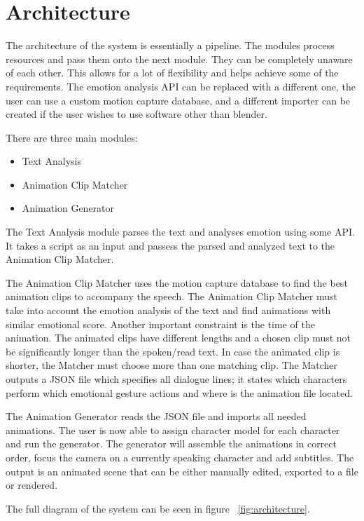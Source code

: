 \section{Architecture}

The architecture of the system is essentially a pipeline. The modules process resources and pass them onto the next module. They can be completely unaware of each other. This allows for a lot of flexibility and helps achieve some of the requirements. The emotion analysis API can be replaced with a different one, the user can use a custom motion capture database, and a different importer can be created if the user wishes to use software other than blender.


There are three main modules:
\begin{itemize}
\item Text Analysis
\item Animation Clip Matcher
\item Animation Generator
\end{itemize}

The Text Analysis module parses the text and analyses emotion using some API. It takes a script as an input and passess the parsed and analyzed text to the Animation Clip Matcher.

The Animation Clip Matcher uses the motion capture database to find the best animation clips to accompany the speech. The Animation Clip Matcher must take into account the emotion analysis of the text and find animations with similar emotional score. Another important constraint is the time of the animation. The animated clips have different lengths and a chosen clip must not be significantly longer than the spoken/read text. In case the animated clip is shorter, the Matcher must choose more than one matching clip. The Matcher outputs a JSON file which specifies all dialogue lines; it states which characters perform which emotional gesture actions and where is the animation file located.

The Animation Generator reads the JSON file and imports all needed animations. The user is now able to assign character model for each character and run the generator. The generator will assemble the animations in correct order, focus the camera on a currently speaking character and add subtitles. The output is an animated scene that can be either manually edited, exported to a file or rendered.

The full diagram of the system can be seen in figure ~\ref{fig:architecture}.


